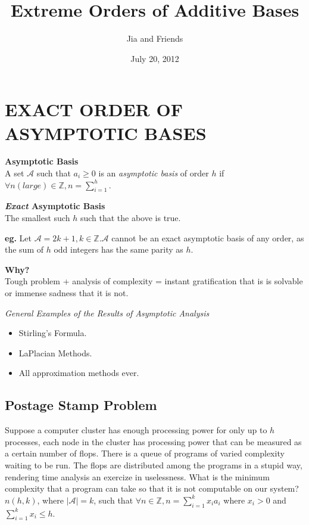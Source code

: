 \documentclass[a4paper,10pt,english]{sphinxhowto}
\title{Extreme Orders of Additive Bases}
\author{Jia and Friends}
\date{July 20, 2012}
\def\A{{\mathcal A}}
\def\ai{{a_{i}}}
\def\xi{{x_{i}}}
\begin{document}
\maketitle




\section*{EXACT ORDER OF ASYMPTOTIC BASES}
\label{index:asymptotic-bases}

\textbf{Asymptotic Basis}\\
A set $\A$ such that $\ai \geq 0$ is an \emph{asymptotic basis} of order $h$ if $ \forall n (large) \in \mathbb{Z}, n = \sum_{i=1}^h$.

\textbf{\emph{Exact} Asymptotic Basis}\\
The smallest such $h$ such that the above is true.

\textbf{eg.} Let $\A = {2k + 1, k \in \mathbb{Z} }. \A $ cannot be an exact asymptotic basis of any order, as the sum of $h$ odd integers has the same parity as $h$.

\textbf{Why?}\\
Tough problem + analysis of complexity = instant gratification that is is solvable or immense sadness that it is not.

\emph{General Examples of the Results of Asymptotic Analysis}
\begin{itemize}
\item Stirling's Formula.
\item LaPlacian Methods.
\item All approximation methods ever.
\end{itemize}

\subsection*{Postage Stamp Problem}
Suppose a computer cluster has enough processing power for only up to $h$ processes, each node in the cluster has processing power that can be measured as a certain number of flops. There is a queue of programs of varied complexity waiting to be run. The flops are distributed among the programs in a stupid way, rendering time analysis an exercize in uselessness.
What is the minimum complexity that a program can take so that it is not computable on our system?
\\
$n(h, k)$, where $ \vert \A \vert = k$, such that $\forall n \in \mathbb{Z}, n = \sum_{i=1}^k \xi \ai$ where $\xi > 0$ and $\sum_{i=1}^k \xi \leq h$.
\end{document}
